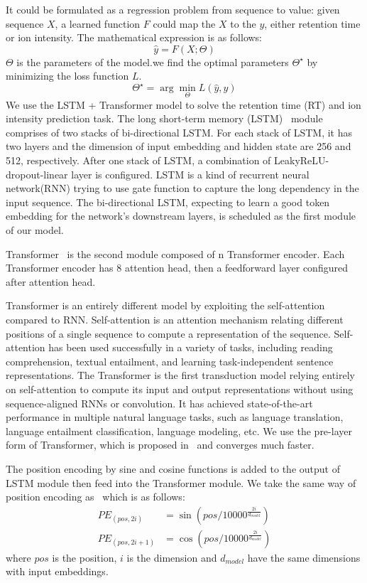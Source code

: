 
It could be formulated as a regression problem from sequence to value: given sequence \( X \), a learned
function \( F \) could map the \( X \) to the \( y \), either retention time or ion intensity. The mathematical expression is as follows:
\[ \hat{y} = F(X;\Theta) \]
$\Theta$ is the parameters of the model.we find the optimal parameters \( \Theta^\star\) by minimizing  the loss function \( L \).
\[ \Theta^\star = \arg\min_{\Theta} L(\hat{y}, y) \]
We use the LSTM + Transformer model to solve the retention time (RT) and ion intensity prediction task.
The long short-term memory (LSTM)~\cite{hochreiter1997long} module comprises of two stacks of bi-directional LSTM. For each stack of LSTM, it has two layers and the dimension of input embedding and hidden state are 256 and 512, respectively. After one stack of LSTM, a combination of LeakyReLU-dropout-linear layer is configured. LSTM is a kind of recurrent neural network(RNN) trying to use gate function to capture the long dependency in the input sequence. The bi-directional LSTM, expecting to learn a good token embedding for the network's downstream layers, is scheduled as the first module of our model.

Transformer~\cite{vaswani2017attention} is the second module composed of n Transformer encoder.
Each Transformer encoder has 8 attention head, then a feedforward layer configured after attention head.


Transformer is an entirely different model by exploiting the self-attention compared to RNN.
Self-attention is an attention mechanism relating different positions of a single sequence to compute a representation of the sequence. Self-attention has been used successfully in a variety of tasks, including reading
comprehension, textual entailment, and learning task-independent sentence representations.
The Transformer is the first transduction model relying entirely on self-attention to compute its input and output representations without using sequence-aligned RNNs or convolution. It has achieved state-of-the-art performance in multiple natural language tasks, such as language translation, language entailment classification, language modeling, etc. We use the pre-layer form of Transformer, which is proposed in~\cite{xiong2020layer} and converges much faster.

The position encoding by sine and cosine functions is added to the output of LSTM module then feed into the Transformer module.
We take the same way of position encoding as~\cite{vaswani2017attention} which is as follows:
\begin{align*}
    PE_{(pos, 2i)} &= \sin{(pos/10000^{\frac{2i}{d_{model}}})} \\
    PE_{(pos, 2i+1)} &= \cos{(pos/10000^{\frac{2i}{d_{model}}})}
\end{align*}
where $pos$  is the position, $i$ is the dimension and $d_{model}$ have the same dimensions with input embeddings.

